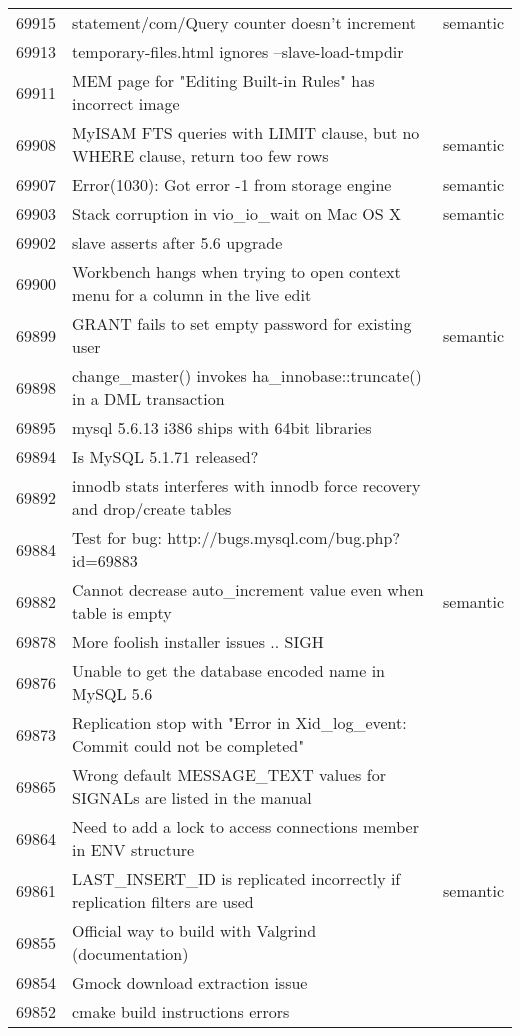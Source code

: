 \begin{longtable}[c]{p{1cm}p{10cm}p{1cm}}
69915 & statement/com/Query counter doesn't increment & semantic \\
69913 & temporary-files.html ignores --slave-load-tmpdir &  \\
69911 & MEM page for "Editing Built-in Rules" has incorrect image &  \\
69908 & MyISAM FTS queries with LIMIT clause, but no WHERE clause, return too few rows & semantic \\
69907 & Error(1030): Got error -1 from storage engine & semantic \\
69903 & Stack corruption in vio\_io\_wait on Mac OS X & semantic \\
69902 & slave asserts after 5.6 upgrade &  \\
69900 & Workbench hangs when trying to open context menu for a column in the live edit &  \\
69899 & GRANT fails to set empty password for existing user & semantic \\
69898 & change\_master() invokes ha\_innobase::truncate() in a DML transaction &  \\
69895 & mysql 5.6.13 i386 ships with 64bit libraries &  \\
69894 & Is MySQL 5.1.71 released? &  \\
69892 & innodb stats interferes with innodb force recovery and drop/create tables &  \\
69884 & Test for bug: http://bugs.mysql.com/bug.php?id=69883 &  \\
69882 & Cannot decrease auto\_increment value even when table is empty & semantic \\
69878 & More foolish installer issues .. SIGH &  \\
69876 & Unable to get the database encoded name in MySQL 5.6 &  \\
69873 & Replication stop with "Error in Xid\_log\_event: Commit could not be completed" &  \\
69865 & Wrong default MESSAGE\_TEXT values for SIGNALs are listed in the manual &  \\
69864 & Need to add a lock to access connections member in ENV structure &  \\
69861 & LAST\_INSERT\_ID is replicated incorrectly if replication filters are used & semantic \\
69855 & Official way to build with Valgrind (documentation) &  \\
69854 & Gmock download extraction issue &  \\
69852 & cmake build instructions errors &  \\

\end{longtable}
